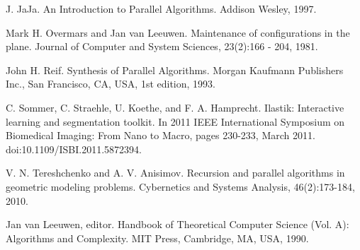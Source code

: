 \documentclass[twoside,twocolumn,10pt]{article}
\begin{document}
\begin{thebibliography}{99}
 J. JaJa. An Introduction to Parallel Algorithms. Addison Wesley, 1997.

 Mark H. Overmars and Jan van Leeuwen. Maintenance of configurations in the plane.
Journal of Computer and System Sciences, 23(2):166 - 204, 1981.

 John H. Reif. Synthesis of Parallel Algorithms. Morgan Kaufmann Publishers Inc., San
Francisco, CA, USA, 1st edition, 1993.

 C. Sommer, C. Straehle, U. Koethe, and F. A. Hamprecht. Ilastik: Interactive learning
and segmentation toolkit. In 2011 IEEE International Symposium on Biomedical Imaging:
From Nano to Macro, pages 230-233, March 2011. doi:10.1109/ISBI.2011.5872394.

 V. N. Tereshchenko and A. V. Anisimov. Recursion and parallel algorithms in geometric
modeling problems. Cybernetics and Systems Analysis, 46(2):173-184, 2010.

 Jan van Leeuwen, editor. Handbook of Theoretical Computer Science (Vol. A): Algorithms
and Complexity. MIT Press, Cambridge, MA, USA, 1990.
\end{thebibliography}

%
%


%
%
\end{document}
